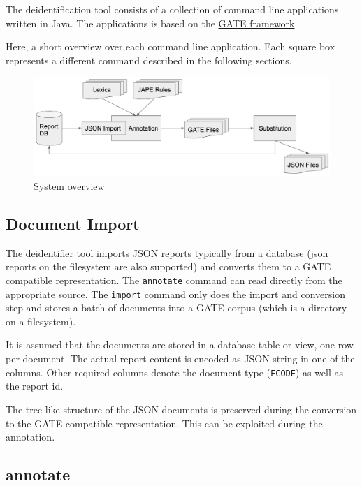
The deidentification tool consists of a collection of command line
applications written in Java. The applications is based on the
\href{https://gate.ac.uk/}{GATE framework}

Here, a short overview over each command line application. Each square
box represents a different command described in the following sections.

\begin{figure}
\centering
\includegraphics[width=\textwidth]{figs/system_overview.png}
\caption{System overview}
\end{figure}

\subsection{Document Import}\label{document-import}

The deidentifier tool imports JSON reports typically from a database
(json reports on the filesystem are also supported) and converts them to
a GATE compatible representation. The \texttt{annotate} command can read
directly from the appropriate source. The \texttt{import} command only
does the import and conversion step and stores a batch of documents into
a GATE corpus (which is a directory on a filesystem).

It is assumed that the documents are stored in a database table or view,
one row per document. The actual report content is encoded as JSON
string in one of the columns. Other required columns denote the document
type (\texttt{FCODE}) as well as the report id.

The tree like structure of the JSON documents is preserved during the
conversion to the GATE compatible representation. This can be exploited
during the annotation.

\subsection{annotate}\label{annotate}

